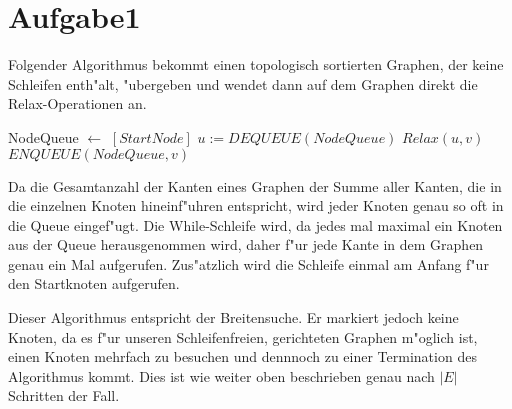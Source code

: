 \documentclass{article}
\begin{document}
\section*{Aufgabe1}
Folgender Algorithmus bekommt einen topologisch sortierten Graphen, der
keine Schleifen enth"alt, "ubergeben und wendet dann auf dem Graphen direkt
die Relax-Operationen an.

\begin{algorithmic}
\STATE NodeQueue \(\leftarrow\) \(\left[StartNode\right]\)
    \STATE \(u := DEQUEUE(NodeQueue)\)
	\STATE \(Relax(u,v)\)
	\STATE \(ENQUEUE(NodeQueue, v)\)
    \ENDFOR
\ENDWHILE
\end{algorithmic}

Da die Gesamtanzahl der Kanten eines Graphen der Summe aller Kanten, die in
die einzelnen Knoten hineinf"uhren entspricht, wird jeder Knoten genau so oft
in die Queue eingef"ugt. Die While-Schleife wird, da jedes mal maximal ein
Knoten aus der Queue herausgenommen wird, daher f"ur jede Kante in dem
Graphen genau ein Mal aufgerufen. Zus"atzlich wird die Schleife einmal am
Anfang f"ur den Startknoten aufgerufen.

Dieser Algorithmus entspricht der Breitensuche. Er markiert jedoch keine
Knoten, da es f"ur unseren Schleifenfreien, gerichteten Graphen m"oglich
ist, einen Knoten mehrfach zu besuchen und dennnoch zu einer Termination des
Algorithmus kommt. Dies ist wie weiter oben beschrieben genau nach
\(\left|E\right|\) Schritten der Fall.
\end{document}
